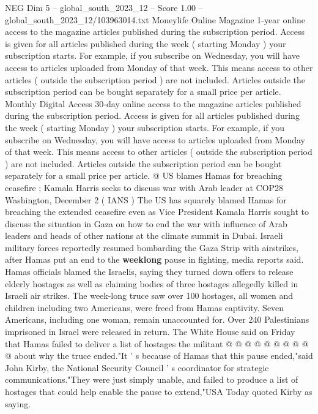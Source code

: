 \begin{textsample}{NEG Dim 5 – global\_south\_2023\_12 – Score 1.00 – global\_south\_2023\_12/103963014.txt}  \label{ex:f5_neg_237}
Moneylife Online Magazine 1-year online access to the magazine articles published during the subscription period.
Access is given for all articles published during the week ( starting Monday ) your subscription starts.
For example, if you subscribe on Wednesday, you will have access to articles uploaded from Monday of that week.
This means access to other articles ( outside the subscription period ) are not included.
Articles outside the subscription period can be bought separately for a small price per article.
Monthly Digital Access 30-day online access to the magazine articles published during the subscription period.
Access is given for all articles published during the week ( starting Monday ) your subscription starts.
For example, if you subscribe on Wednesday, you will have access to articles uploaded from Monday of that week.
This means access to other articles ( outside the subscription period ) are not included.
Articles outside the subscription period can be bought separately for a small price per article. @ US blames Hamas for breaching ceasefire ; Kamala Harris seeks to discuss war with Arab leader at COP28 Washington, December 2 ( IANS ) The US has squarely blamed Hamas for breaching the extended ceasefire even as Vice President Kamala Harris sought to discuss the situation in Gaza on how to end the war with influence of Arab leaders and heads of other nations at the climate summit in Dubai.
Israeli military forces reportedly resumed bombarding the Gaza Strip with airstrikes, after Hamas put an end to the \textbf{weeklong} pause in fighting, media reports said.
Hamas officials blamed the Israelis, saying they turned down offers to release elderly hostages as well as claiming bodies of three hostages allegedly killed in Israeli air strikes.
The week-long truce saw over 100 hostages, all women and children including two Americans, were freed from Hamas captivity.
Seven Americans, including one woman, remain unaccounted for.
Over 240 Palestinians imprisoned in Israel were released in return.
The White House said on Friday that Hamas failed to deliver a list of hostages the militant @ @ @ @ @ @ @ @ @ @ about why the truce ended."It ' s because of Hamas that this pause ended,"said John Kirby, the National Security Council ' s coordinator for strategic communications."They were just simply unable, and failed to produce a list of hostages that could help enable the pause to extend,"USA Today quoted Kirby as saying.

\end{textsample}
